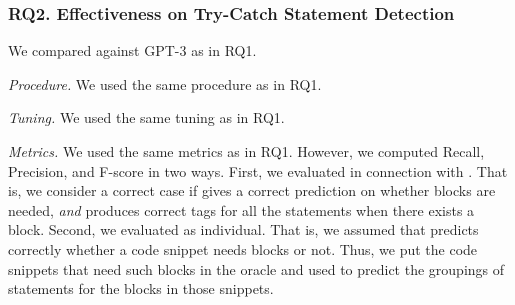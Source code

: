 \subsubsection{RQ2. Effectiveness on Try-Catch Statement Detection}
 We compared {\xstate} against GPT-3 as in RQ1.


{\em Procedure.} We used the same procedure as in RQ1.

{\em Tuning.} We used the same tuning as in RQ1.

{\em Metrics.} We used the same metrics as in RQ1. However, we
computed Recall, Precision, and F-score in two ways. First, we
evaluated {\xstate} in connection with {\xblock}. That is, we consider
a correct case if {\xblock} gives a correct prediction on whether
 blocks are needed, {\em and} {\xstate} produces correct tags for all the statements when there exists a  block. Second,
we evaluated {\xstate} as individual. That is, we assumed that
{\xblock} predicts correctly whether a code snippet needs
 blocks or not. Thus, we put the code snippets that
need such blocks in the oracle and used {\xstate} to predict the groupings of
statements for the blocks in those snippets.




